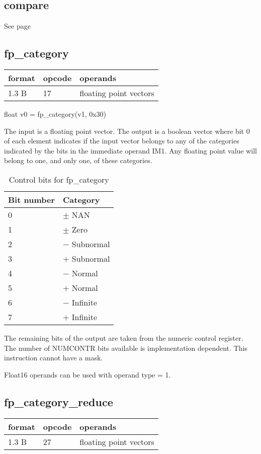 \documentclass[forwardcom.tex]{subfiles}
\begin{document}
\subsection{compare}
See page \pageref{table:compareInstruction}
\vv


\subsection{fp\_category}
\label{table:fpCategoryInstruction}
\begin{tabular}{|p{12mm}|p{15mm}|p{100mm}|}
\hline
\bfseries format & \bfseries opcode & \bfseries operands \\ \hline
1.3 B & 17 & floating point vectors \\ \hline
\end{tabular}
\vv

float v0 = fp\_category(v1, 0x30)
\vv

The input is a floating point vector. The output is a boolean vector where bit 0 of each element indicates if the input vector belongs to any of the categories indicated by the bits in the immediate operand IM1. Any floating point value will belong to one, and only one, of these categories. 
\vv

\begin{longtable} {|p{24mm}|p{90mm}|}
\caption{Control bits for fp\_category} 
\label{table:fpCategoryInstructionBits} \\
\endfirsthead
\endhead
\hline
\bfseries Bit number & \bfseries Category  \\
\hline
0 & $\pm$ NAN \\
1 & $\pm$ Zero \\
2 & $-$ Subnormal \\
3 & $+$ Subnormal \\
4 & $-$ Normal \\
5 & $+$ Normal \\
6 & $-$ Infinite  \\
7 & $+$ Infinite  \\
\hline
\end{longtable}
\vv

The remaining bits of the output are taken from the numeric control register. The number of NUMCONTR bits available is implementation dependent. This instruction cannot have a mask.
\vv

Float16 operands can be used with operand type = 1.
\vv


\subsection{fp\_category\_reduce}
\label{table:fpCategoryReduceInstruction}
\begin{tabular}{|p{12mm}|p{15mm}|p{100mm}|}
\hline
\bfseries format & \bfseries opcode & \bfseries operands \\ \hline
1.3 B & 27 & floating point vectors \\ \hline
\end{tabular}
\vv
\end{document}
